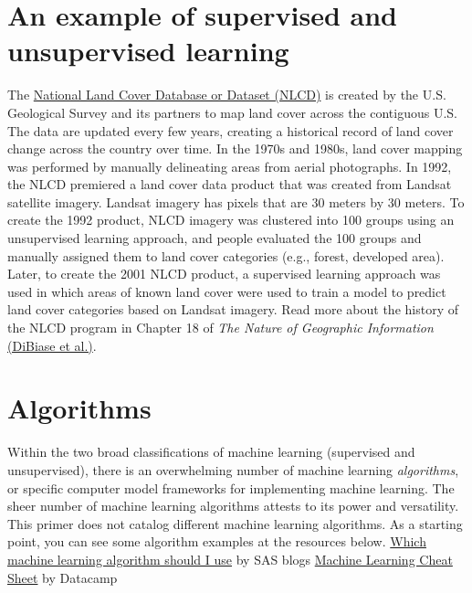 \documentclass[
]{book}
\begin{document}
\hypertarget{an-example-of-supervised-and-unsupervised-learning}{%
\section{An example of supervised and unsupervised learning}\label{an-example-of-supervised-and-unsupervised-learning}}

The \href{https://www.usgs.gov/centers/eros/science/national-land-cover-database}{National Land Cover Database or Dataset (NLCD)} is created by the U.S. Geological Survey and its partners to map land cover across the contiguous U.S. The data are updated every few years, creating a historical record of land cover change across the country over time. In the 1970s and 1980s, land cover mapping was performed by manually delineating areas from aerial photographs. In 1992, the NLCD premiered a land cover data product that was created from Landsat satellite imagery. Landsat imagery has pixels that are 30 meters by 30 meters. To create the 1992 product, NLCD imagery was clustered into 100 groups using an unsupervised learning approach, and people evaluated the 100 groups and manually assigned them to land cover categories (e.g., forest, developed area). Later, to create the 2001 NLCD product, a supervised learning approach was used in which areas of known land cover were used to train a model to predict land cover categories based on Landsat imagery. Read more about the history of the NLCD program in Chapter 18 of \emph{The Nature of Geographic Information} \href{https://www.e-education.psu.edu/natureofgeoinfo/}{(DiBiase et al.)}.

\hypertarget{algorithms}{%
\section{Algorithms}\label{algorithms}}

Within the two broad classifications of machine learning (supervised and unsupervised), there is an overwhelming number of machine learning \emph{algorithms}, or specific computer model frameworks for implementing machine learning. The sheer number of machine learning algorithms attests to its power and versatility. This primer does not catalog different machine learning algorithms. As a starting point, you can see some algorithm examples at the resources below.
\href{https://blogs.sas.com/content/subconsciousmusings/2020/12/09/machine-learning-algorithm-use/}{Which machine learning algorithm should I use} by SAS blogs
\href{https://www.datacamp.com/cheat-sheet/machine-learning-cheat-sheet?utm_source=google\&utm_medium=paid_search\&utm_campaignid=19589720830\&utm_adgroupid=157098107695\&utm_device=c\&utm_keyword=\&utm_matchtype=\&utm_network=g\&utm_adpostion=\&utm_creative=698229375346\&utm_targetid=dsa-2264919291829\&utm_loc_interest_ms=\&utm_loc_physical_ms=9009732\&utm_content=DSA~blog~Julia\&utm_campaign=230119_1-sea~dsa~tofu_2-b2c_3-us_4-prc_5-na_6-na_7-le_8-pdsh-go_9-na_10-na_11-na-may24\&gad_source=1\&gclid=Cj0KCQjw6PGxBhCVARIsAIumnWai3I4X4UtrhM_2dA1pUpmAmC-iErsp57Cv6p4fEQugIVbGrx1VT2YaAsr7EALw_wcB}{Machine Learning Cheat Sheet} by Datacamp
\end{document}
